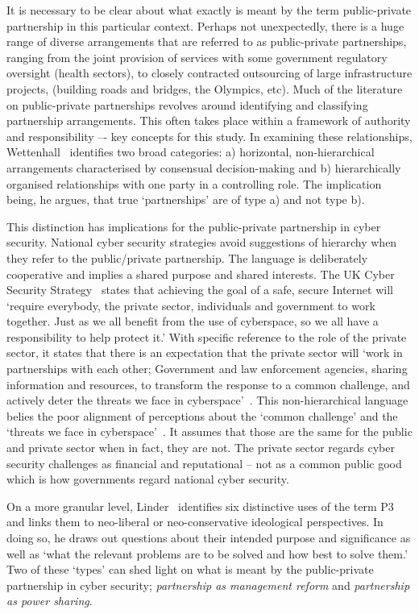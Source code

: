 \documentclass[a4paper,11pt]{article}
\begin{document}
It is necessary to be clear about what exactly is meant by the
term public-private partnership in this particular context. Perhaps
not unexpectedly, there is a huge range of diverse arrangements that
are referred to as public-private partnerships, ranging from the joint
provision of services with some government regulatory oversight
(health sectors), to closely contracted outsourcing of large
infrastructure projects, (building roads and bridges, the Olympics,
etc). Much of the literature on public-private partnerships revolves
around identifying and classifying partnership arrangements. This
often takes place within a framework of authority and responsibility
–- key concepts for this study. In examining these relationships,
Wettenhall~\cite{wettenhall:2003} identifies two broad categories: a)
horizontal, non-hierarchical arrangements characterised by consensual
decision-making and b) hierarchically organised relationships with one
party in a controlling role. The implication being, he argues, that
true `partnerships' are of type a) and not type b).

This distinction has implications for the public-private partnership
in cyber security. National cyber security strategies avoid
suggestions of hierarchy when they refer to the public/private
partnership. The language is deliberately cooperative and implies a
shared purpose and shared interests. The UK Cyber Security
Strategy~\cite{ukcss:2011} states that achieving the goal of a safe,
secure Internet will `require everybody, the private sector,
individuals and government to work together. Just as we all benefit
from the use of cyberspace, so we all have a responsibility to help
protect it.' With specific reference to the role of the private
sector, it states that there is an expectation that the private sector
will `work in partnerships with each other; Government and law
enforcement agencies, sharing information and resources, to transform
the response to a common challenge, and actively deter the threats we
face in cyberspace'~\cite{ukcss:2013}.  This non-hierarchical language
belies the poor alignment of perceptions about the `common challenge'
and the `threats we face in cyberspace'~\cite{uknao:2013}. It assumes
that those are the same for the public and private sector when in
fact, they are not. The private sector regards cyber security
challenges as financial and reputational -- not as a common public
good which is how governments regard national cyber security.

On a more granular level, Linder~\cite{linder:1999} identifies six
distinctive uses of the term P3 and links them to neo-liberal or
neo-conservative ideological perspectives. In doing so, he draws out
questions about their intended purpose and significance as well as
`what the relevant problems are to be solved and how best to solve
them.'  Two of these `types' can shed light on what is meant by the
public-private partnership in cyber security; {\emph{partnership as
management reform}} and {\emph{partnership as power sharing}}.
\end{document}
